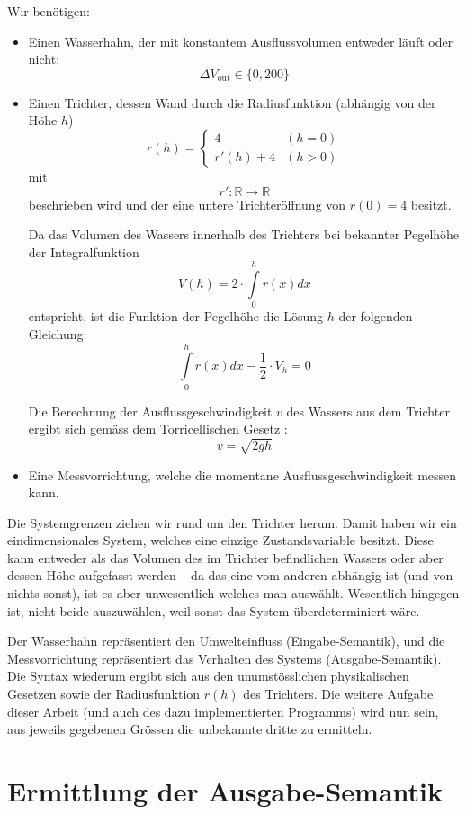 \documentclass[11pt]{scrreprt} %
\theoremstyle{definition}
\begin{document}
Wir benötigen:

\begin{itemize}
\item Einen Wasserhahn, der mit konstantem Ausflussvolumen entweder läuft oder nicht:
\[
	\Delta V_{\text{out}} \in \{ 0, 200 \}
\]
\item Einen Trichter, dessen Wand durch die Radiusfunktion (abhängig von der Höhe $h$)
\[
	r(h) = \begin{cases}
		4 & (h = 0) \\
		r'(h) + 4 & (h > 0)
	\end{cases}
\]
mit 
\[
	r' : \mathbb{R} \rightarrow \mathbb{R}
\]
beschrieben wird und der eine untere Trichteröffnung von $r(0) = 4$ besitzt.

Da das Volumen des Wassers innerhalb des Trichters bei bekannter Pegelhöhe der Integralfunktion
\[
V(h) = 2\cdot \int\limits_{0}^{h} r(x) dx
\]
entspricht, ist die Funktion der Pegelhöhe die Lösung $h$ der folgenden Gleichung:
\[
\int\limits_{0}^{h} r(x) dx - \frac 1 2 \cdot V_h = 0
\]

Die Berechnung der Ausflussgeschwindigkeit $v$ des Wassers aus dem Trichter ergibt sich gemäss dem Torricellischen Gesetz \cite{wiki:ausflussgeschwindigkeit}:
\[
v = \sqrt{2gh}
\]

\item Eine Messvorrichtung, welche die momentane Ausflussgeschwindigkeit messen kann.

\end{itemize}

Die Systemgrenzen ziehen wir rund um den Trichter herum. Damit haben wir ein eindimensionales System, welches eine einzige Zustandsvariable besitzt. Diese kann entweder als das Volumen des im Trichter befindlichen Wassers oder aber dessen Höhe aufgefasst werden -- da das eine vom anderen abhängig ist (und von nichts sonst), ist es aber unwesentlich welches man auswählt. Wesentlich hingegen ist, nicht beide auszuwählen, weil sonst das System überdeterminiert wäre.

Der Wasserhahn repräsentiert den Umwelteinfluss (Eingabe-Semantik), und die Messvorrichtung repräsentiert das Verhalten des Systems (Ausgabe-Semantik). Die Syntax wiederum ergibt sich aus den unumstösslichen physikalischen Gesetzen sowie der Radiusfunktion $r(h)$ des Trichters. Die weitere Aufgabe dieser Arbeit (und auch des dazu implementierten Programms) wird nun sein, aus jeweils gegebenen  Grössen die unbekannte dritte zu ermitteln.

\section{Ermittlung der Ausgabe-Semantik}
\end{document}
